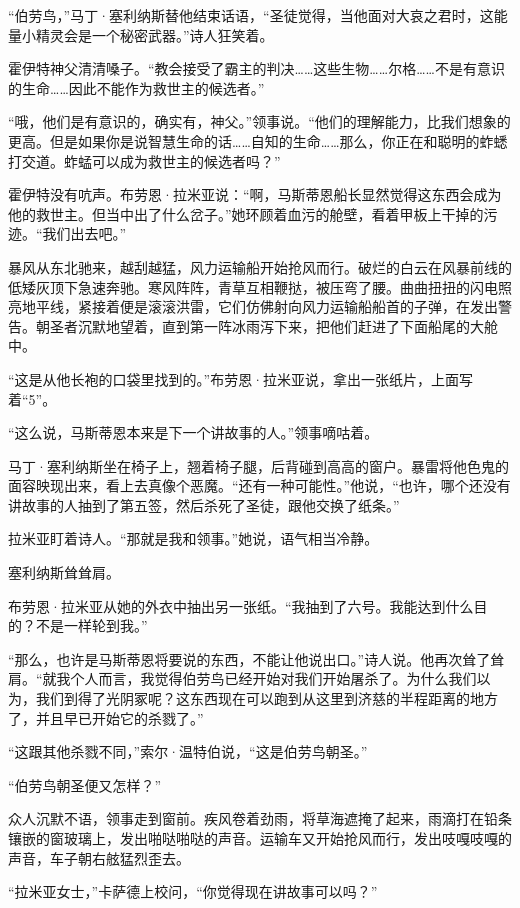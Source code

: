 \documentclass[AutoFakeBold=true]{book}
\begin{document}
``伯劳鸟，''马丁·塞利纳斯替他结束话语，``圣徒觉得，当他面对大哀之君时，这能量小精灵会是一个秘密武器。''诗人狂笑着。

霍伊特神父清清嗓子。``教会接受了霸主的判决……这些生物……尔格……不是有意识的生命……因此不能作为救世主的候选者。''

``哦，他们是有意识的，确实有，神父。''领事说。``他们的理解能力，比我们想象的更高。但是如果你是说智慧生命的话……自知的生命……那么，你正在和聪明的蚱蟋打交道。蚱蜢可以成为救世主的候选者吗？''

霍伊特没有吭声。布劳恩·拉米亚说：``啊，马斯蒂恩船长显然觉得这东西会成为他的救世主。但当中出了什么岔子。''她环顾着血污的舱壁，看着甲板上干掉的污迹。``我们出去吧。''

\vspace*{1em}

暴风从东北驰来，越刮越猛，风力运输船开始抢风而行。破烂的白云在风暴前线的低矮灰顶下急速奔驰。寒风阵阵，青草互相鞭挞，被压弯了腰。曲曲扭扭的闪电照亮地平线，紧接着便是滚滚洪雷，它们仿佛射向风力运输船船首的子弹，在发出警告。朝圣者沉默地望着，直到第一阵冰雨泻下来，把他们赶进了下面船尾的大舱中。

``这是从他长袍的口袋里找到的。''布劳恩·拉米亚说，拿出一张纸片，上面写着``5''。

``这么说，马斯蒂恩本来是下一个讲故事的人。''领事嘀咕着。

马丁·塞利纳斯坐在椅子上，翘着椅子腿，后背碰到高高的窗户。暴雷将他色鬼的面容映现出来，看上去真像个恶魔。``还有一种可能性。''他说，``也许，哪个还没有讲故事的人抽到了第五签，然后杀死了圣徒，跟他交换了纸条。''

拉米亚盯着诗人。``那就是我和领事。''她说，语气相当冷静。

塞利纳斯耸耸肩。

布劳恩·拉米亚从她的外衣中抽出另一张纸。``我抽到了六号。我能达到什么目的？不是一样轮到我。''

``那么，也许是马斯蒂恩将要说的东西，不能让他说出口。''诗人说。他再次耸了耸肩。``就我个人而言，我觉得伯劳鸟已经开始对我们开始屠杀了。为什么我们以为，我们到得了光阴冢呢？这东西现在可以跑到从这里到济慈的半程距离的地方了，并且早已开始它的杀戮了。''

``这跟其他杀戮不同，''索尔·温特伯说，``这是伯劳鸟朝圣。''

``伯劳鸟朝圣便又怎样？''

众人沉默不语，领事走到窗前。疾风卷着劲雨，将草海遮掩了起来，雨滴打在铅条镶嵌的窗玻璃上，发出啪哒啪哒的声音。运输车又开始抢风而行，发出吱嘎吱嘎的声音，车子朝右舷猛烈歪去。

``拉米亚女士，''卡萨德上校问，``你觉得现在讲故事可以吗？''
\end{document}
